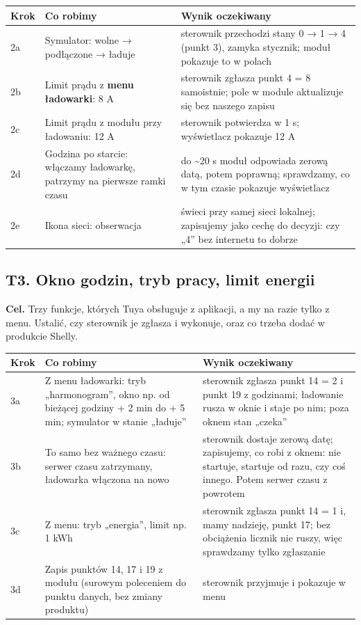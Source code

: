\documentclass[11pt,a4paper]{article}
\begin{document}
\begin{longtable}{>{\raggedright\arraybackslash}p{3.00cm}>{\raggedright\arraybackslash}p{4.66cm}>{\raggedright\arraybackslash}p{7.62cm}}
\toprule
\rowcolor{apteallight}\textbf{Krok} & \textbf{Co robimy} & \textbf{Wynik oczekiwany} \\
\midrule\endhead
\bottomrule\endfoot
2a & Symulator: wolne {\symbolfont→} podłączone {\symbolfont→} ładuje & sterownik przechodzi stany 0 {\symbolfont→} 1 {\symbolfont→} 4 (punkt 3), zamyka stycznik; moduł pokazuje to w polach \\
2b & Limit prądu z \textbf{menu ładowarki}: 8 A & sterownik zgłasza punkt 4 = 8 samoistnie; pole w module aktualizuje się bez naszego zapisu \\
2c & Limit prądu z modułu przy ładowaniu: 12 A & sterownik potwierdza w 1 s; wyświetlacz pokazuje 12 A \\
2d & Godzina po starcie: włączamy ładowarkę, patrzymy na pierwsze ramki czasu & do \textasciitilde{}20 s moduł odpowiada zerową datą, potem poprawną; sprawdzamy, co w tym czasie pokazuje wyświetlacz \\
2e & Ikona sieci: obserwacja & świeci przy samej sieci lokalnej; zapisujemy jako cechę do decyzji: czy „4” bez internetu to dobrze \\
\end{longtable}

\subsection{T3. Okno godzin, tryb pracy, limit energii}

\textbf{Cel.} Trzy funkcje, których Tuya obsługuje z aplikacji, a my na razie tylko z menu. Ustalić, czy sterownik je zgłasza i wykonuje, oraz co trzeba dodać w produkcie Shelly.


\begin{longtable}{>{\raggedright\arraybackslash}p{3.00cm}>{\raggedright\arraybackslash}p{6.14cm}>{\raggedright\arraybackslash}p{6.14cm}}
\toprule
\rowcolor{apteallight}\textbf{Krok} & \textbf{Co robimy} & \textbf{Wynik oczekiwany} \\
\midrule\endhead
\bottomrule\endfoot
3a & Z menu ładowarki: tryb „harmonogram”, okno np. od bieżącej godziny + 2 min do + 5 min; symulator w stanie „ładuje” & sterownik zgłasza punkt 14 = 2 i punkt 19 z godzinami; ładowanie rusza w oknie i staje po nim; poza oknem stan „czeka” \\
3b & To samo bez ważnego czasu: serwer czasu zatrzymany, ładowarka włączona na nowo & sterownik dostaje zerową datę; zapisujemy, co robi z oknem: nie startuje, startuje od razu, czy coś innego. Potem serwer czasu z powrotem \\
3c & Z menu: tryb „energia”, limit np. 1 kWh & sterownik zgłasza punkt 14 = 1 i, mamy nadzieję, punkt 17; bez obciążenia licznik nie ruszy, więc sprawdzamy tylko zgłaszanie \\
3d & Zapis punktów 14, 17 i 19 z modułu (surowym poleceniem do punktu danych, bez zmiany produktu) & sterownik przyjmuje i pokazuje w menu \\
\end{longtable}
\end{document}
